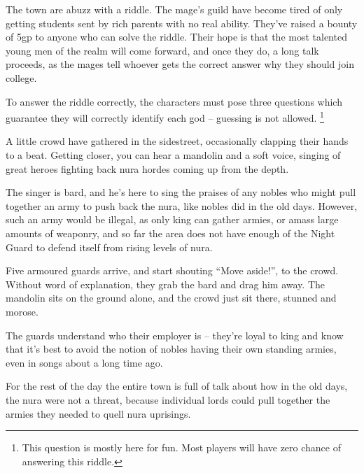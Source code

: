 \begin{multicols}{2}
The town are abuzz with a riddle.  The mage's guild have become tired of only getting students sent by rich parents with no real ability.  They've raised a bounty of 5gp to anyone who can solve the riddle.  Their hope is that the most talented young men of the realm will come forward, and once they do, a long talk proceeds, as the mages tell whoever gets the correct answer why they should join \gls{college}.

To answer the riddle correctly, the characters must pose three questions which guarantee they will correctly identify each god -- guessing is not allowed.
\footnote{This question is mostly here for fun.  Most players will have zero chance of answering this riddle.}


\begin{boxtext}
	A little crowd have gathered in the sidestreet, occasionally clapping their hands to a beat.  Getting closer, you can hear a mandolin and a soft voice, singing of great heroes fighting back nura hordes coming up from the depth.
\end{boxtext}

The singer is \gls{bard}, and he's here to sing the praises of any nobles who might pull together an army to push back the nura, like nobles did in the old days.  However, such an army would be illegal, as only \gls{king} can gather armies, or amass large amounts of weaponry, and so far the area does not have enough of the Night Guard to defend itself from rising levels of nura.

\begin{boxtext}
	Five armoured guards arrive, and start shouting ``Move aside!'', to the crowd.  Without word of explanation, they grab the bard and drag him away.  The mandolin sits on the ground alone, and the crowd just sit there, stunned and morose.
\end{boxtext}

The guards understand who their employer is -- they're loyal to \gls{king} and know that it's best to avoid the notion of nobles having their own standing armies, even in songs about a long time ago.

For the rest of the day the entire town is full of talk about how in the old days, the nura were not a threat, because individual lords could pull together the armies they needed to quell nura uprisings.


\end{multicols}
